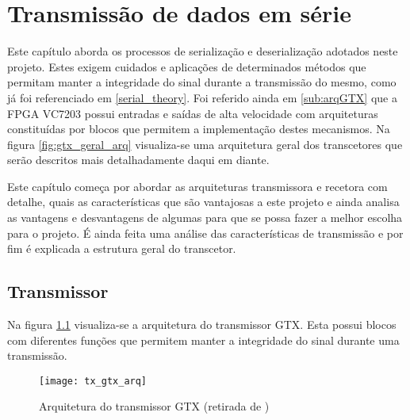 
\chapter{Transmissão de dados em série}\label{chap:chap4}


Este capítulo aborda os processos de serialização e deserialização adotados neste projeto. Estes exigem cuidados e aplicações de determinados métodos que permitam manter a integridade do sinal durante a transmissão do mesmo, como já foi referenciado em \ref{serial_theory}. Foi referido ainda em \ref{sub:arqGTX} que a FPGA VC7203 possui entradas e saídas de alta velocidade com arquiteturas constituídas por blocos que permitem a implementação destes mecanismos. Na figura \ref{fig:gtx_geral_arq} visualiza-se uma arquitetura geral dos transcetores que serão descritos mais detalhadamente daqui em diante.

Este capítulo começa por abordar as arquiteturas transmissora e recetora com detalhe, quais as características que são vantajosas a este projeto e ainda analisa as vantagens e desvantagens de algumas para que se possa fazer a melhor escolha para o projeto. É ainda feita uma análise das características de transmissão e por fim é explicada a estrutura geral do transcetor.

\section{Transmissor} \label{sec:tx_gtx}

Na figura \ref{fig:gtx_tx_arq} visualiza-se a arquitetura do transmissor GTX.  Esta possui blocos com diferentes funções que permitem manter a integridade do sinal durante uma transmissão.

\begin{figure}[h!]
	\begin{center}
		\leavevmode
		\texttt{[image: tx\_gtx\_arq]}
		\caption[Arquitetura do transmissor GTX]{Arquitetura do transmissor GTX (retirada de \cite{R011})}
		\label{fig:gtx_tx_arq}
	\end{center}
\end{figure}

